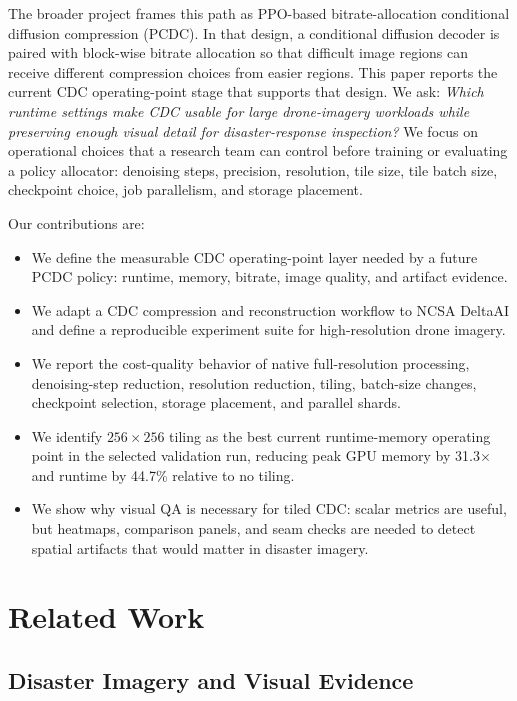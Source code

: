 \documentclass[conference]{IEEEtran}
\begin{document}
The broader project frames this path as PPO-based bitrate-allocation conditional diffusion compression (PCDC). In that design, a conditional diffusion decoder is paired with block-wise bitrate allocation so that difficult image regions can receive different compression choices from easier regions. This paper reports the current CDC operating-point stage that supports that design. We ask: \textit{Which runtime settings make CDC usable for large drone-imagery workloads while preserving enough visual detail for disaster-response inspection?} We focus on operational choices that a research team can control before training or evaluating a policy allocator: denoising steps, precision, resolution, tile size, tile batch size, checkpoint choice, job parallelism, and storage placement.

Our contributions are:
\begin{itemize}
\item We define the measurable CDC operating-point layer needed by a future PCDC policy: runtime, memory, bitrate, image quality, and artifact evidence.
\item We adapt a CDC compression and reconstruction workflow to NCSA DeltaAI and define a reproducible experiment suite for high-resolution drone imagery.
\item We report the cost-quality behavior of native full-resolution processing, denoising-step reduction, resolution reduction, tiling, batch-size changes, checkpoint selection, storage placement, and parallel shards.
\item We identify $256 \times 256$ tiling as the best current runtime-memory operating point in the selected validation run, reducing peak GPU memory by 31.3$\times$ and runtime by 44.7\% relative to no tiling.
\item We show why visual QA is necessary for tiled CDC: scalar metrics are useful, but heatmaps, comparison panels, and seam checks are needed to detect spatial artifacts that would matter in disaster imagery.
\end{itemize}

\section{Related Work}

\subsection{Disaster Imagery and Visual Evidence}
\end{document}

